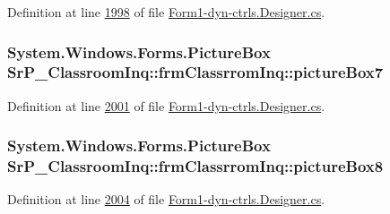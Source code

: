 \-Definition at line \hyperlink{_form1-dyn-ctrls_8_designer_8cs_source_l01998}{1998} of file \hyperlink{_form1-dyn-ctrls_8_designer_8cs_source}{\-Form1-\/dyn-\/ctrls.\-Designer.\-cs}.

\hypertarget{class_sr_p___classroom_inq_1_1frm_classrrom_inq_a48b90a7203524b9da0e6bcba8ea1ba6e}{
\subsubsection[{picture\-Box7}]{\setlength{\rightskip}{0pt plus 5cm}\-System.\-Windows.\-Forms.\-Picture\-Box {\bf \-Sr\-P\-\_\-\-Classroom\-Inq\-::frm\-Classrrom\-Inq\-::picture\-Box7}}}
\label{class_sr_p___classroom_inq_1_1frm_classrrom_inq_a48b90a7203524b9da0e6bcba8ea1ba6e}


\-Definition at line \hyperlink{_form1-dyn-ctrls_8_designer_8cs_source_l02001}{2001} of file \hyperlink{_form1-dyn-ctrls_8_designer_8cs_source}{\-Form1-\/dyn-\/ctrls.\-Designer.\-cs}.

\hypertarget{class_sr_p___classroom_inq_1_1frm_classrrom_inq_a22ca58dbc8343b3531e756221803eb3d}{
\subsubsection[{picture\-Box8}]{\setlength{\rightskip}{0pt plus 5cm}\-System.\-Windows.\-Forms.\-Picture\-Box {\bf \-Sr\-P\-\_\-\-Classroom\-Inq\-::frm\-Classrrom\-Inq\-::picture\-Box8}}}
\label{class_sr_p___classroom_inq_1_1frm_classrrom_inq_a22ca58dbc8343b3531e756221803eb3d}


\-Definition at line \hyperlink{_form1-dyn-ctrls_8_designer_8cs_source_l02004}{2004} of file \hyperlink{_form1-dyn-ctrls_8_designer_8cs_source}{\-Form1-\/dyn-\/ctrls.\-Designer.\-cs}.

